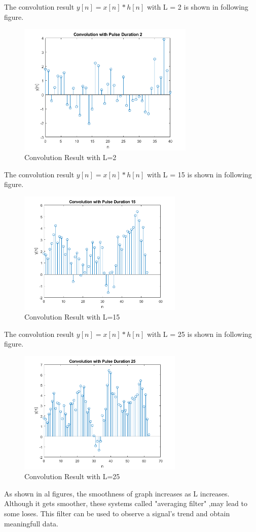 \documentclass[letterpaper,12pt]{article}
\begin{document}
The convolution result \(y[n] = x[n] * h[n]\) with L = 2 is shown in following figure.
\begin{figure}[H]
    \centering
    \includegraphics[width = 0.75\textwidth]{b_duration2.png}
    \caption{Convolution Result with L=2}
    \end{figure} 


    The convolution result \(y[n] = x[n] * h[n]\) with L = 15 is shown in following figure.
    \begin{figure}[H]
        \centering
        \includegraphics[width = 0.7\textwidth]{b_duration15.png}
        \caption{Convolution Result with L=15}
        \end{figure} 

        
        The convolution result \(y[n] = x[n] * h[n]\) with L = 25 is shown in following figure. 
        \begin{figure}[H]
            \centering
            \includegraphics[width = 0.7\textwidth]{b_duration25.png}
            \caption{Convolution Result with L=25}
            \end{figure} 



As shown in al figures, the smoothness of graph increases as L increases. Although it gets smoother, these systems called "averaging filter" ,may lead to some loses. This filter can be used to observe a signal's trend and obtain meaningfull data.
\end{document}
